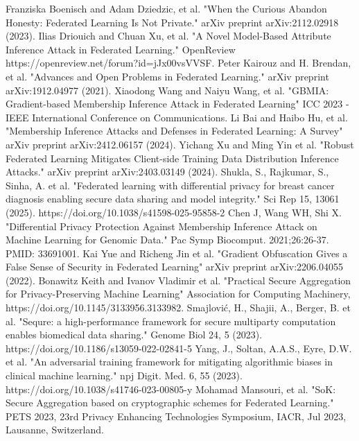 \documentclass[conference]{IEEEtran}
\begin{document}
\begin{thebibliography}{00}
 Franziska Boenisch and Adam Dziedzic, et al. "When the Curious Abandon Honesty: Federated Learning Is Not Private." arXiv preprint arXiv:2112.02918 (2023).
 Ilias Driouich and Chuan Xu, et al. "A Novel Model-Based Attribute Inference Attack in Federated Learning." OpenReview https://openreview.net/forum?id=jJx00vsVVSF.
 Peter Kairouz and H. Brendan, et al. "Advances and Open Problems in Federated Learning." arXiv preprint arXiv:1912.04977 (2021).
 Xiaodong Wang and Naiyu Wang, et al. "GBMIA: Gradient-based Membership Inference Attack in Federated Learning" ICC 2023 - IEEE International Conference on Communications.
 Li Bai and Haibo Hu, et al. "Membership Inference Attacks and Defenses in Federated Learning: A Survey" arXiv preprint arXiv:2412.06157 (2024).
 Yichang Xu and Ming Yin et al. "Robust Federated Learning Mitigates Client-side Training Data Distribution Inference Attacks." arXiv preprint arXiv:2403.03149 (2024).
 Shukla, S., Rajkumar, S., Sinha, A. et al. "Federated learning with differential privacy for breast cancer diagnosis enabling secure data sharing and model integrity." Sci Rep 15, 13061 (2025). https://doi.org/10.1038/s41598-025-95858-2 
 Chen J, Wang WH, Shi X. "Differential Privacy Protection Against Membership Inference Attack on Machine Learning for Genomic Data." Pac Symp Biocomput. 2021;26:26-37. PMID: 33691001.
 Kai Yue and Richeng Jin et al. "Gradient Obfuscation Gives a False Sense of Security in Federated Learning" arXiv preprint arXiv:2206.04055 (2022).
 Bonawitz Keith and Ivanov Vladimir et al. "Practical Secure Aggregation for Privacy-Preserving Machine Learning" Association for Computing Machinery, https://doi.org/10.1145/3133956.3133982.
 Smajlović, H., Shajii, A., Berger, B. et al. "Sequre: a high-performance framework for secure multiparty computation enables biomedical data sharing." Genome Biol 24, 5 (2023). https://doi.org/10.1186/s13059-022-02841-5
 Yang, J., Soltan, A.A.S., Eyre, D.W. et al. "An adversarial training framework for mitigating algorithmic biases in clinical machine learning." npj Digit. Med. 6, 55 (2023). https://doi.org/10.1038/s41746-023-00805-y
  Mohamad Mansouri, et al. "SoK: Secure Aggregation based on cryptographic schemes for Federated Learning." PETS 2023, 23rd Privacy Enhancing Technologies Symposium, IACR, Jul 2023, Lausanne, Switzerland. 

\end{thebibliography}
\end{document}
